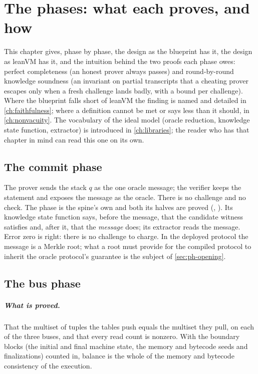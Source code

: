 \chapter{The phases: what each proves, and how}\label{ch:phases}

This chapter gives, phase by phase, the design as the blueprint has it, the design as leanVM
has it, and the intuition behind the two proofs each phase owes: perfect completeness (an
honest prover always passes) and round-by-round knowledge soundness (an invariant on partial
transcripts that a cheating prover escapes only when a fresh challenge lands badly, with a
bound per challenge). Where the blueprint falls short of leanVM the finding is named and
detailed in \cref{ch:faithfulness}; where a definition cannot be met or says less than it
should, in \cref{ch:nonvacuity}. The vocabulary of the ideal model (oracle reduction,
knowledge state function, extractor) is introduced in \cref{ch:libraries}; the reader who has
that chapter in mind can read this one on its own.

\section{The commit phase}\label{sec:ph-commit}

The prover sends the stack $q$ as the one oracle message; the verifier keeps the statement and
exposes the message as the oracle. There is no challenge and no check. The phase is the spine's
own and both its halves are proved (, ). Its knowledge
state function says, before the message, that the candidate witness satisfies 
and, after it, that the \emph{message} does; its extractor reads the message. Error zero is
right: there is no challenge to charge. In the deployed protocol the message is a Merkle root;
what a root must provide for the compiled protocol to inherit the oracle protocol's guarantee
is the subject of \cref{sec:ph-opening}.

\section{The bus phase}\label{sec:ph-bus}

\paragraph{What is proved.} That the multiset of tuples the tables push equals the multiset
they pull, on each of the three buses, and that every read count is nonzero. With the boundary
blocks (the initial and final machine state, the memory and bytecode seeds and finalizations)
counted in, balance is the whole of the memory and bytecode consistency of the execution.


